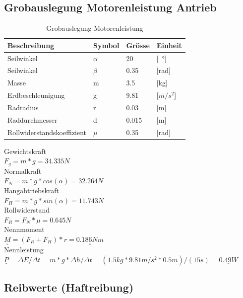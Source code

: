 \documentclass[a4paper]{report}
\begin{document}
\subsection{Grobauslegung Motorenleistung Antrieb}
\label{ssec:GrobMotor}
\begin{table}[h!]
	\begin{tabular}{|p{}|p{}|p{}|p{}|}
		\hline
		\textbf{Beschreibung} & \textbf{Symbol} & \textbf{Grösse}& \textbf{Einheit}  \\
		\hline
		Seilwinkel & $\alpha$ & 20 & [\SI{}{\degree}] \\
		\hline
		Seilwinkel & $\beta$ & 0.35 & [rad] \\
		\hline
		Masse & m & 3.5 & [kg] \\
		\hline
		Erdbeschleunigung & g & 9.81 & [$m/s^2$] \\
		\hline
		Radradius & r & 0.03 & [m] \\
		\hline
		Raddurchmesser & d & 0.015 & [m] \\
		\hline
		Rollwiderstandskoeffizient & $\mu$ & 0.35 & [rad] \\
		\hline
	\end{tabular}
	\caption{Grobauslegung Motorenleistung}
	\label{tbl:Motorenleistung}
\end{table}

\noindent
Gewichtskraft\\
$F_{g}=m*g=34.335 N$	\\
Normalkraft	\\
$F_{N}=m*g*cos(\alpha)=32.264 N$	\\
Hangabtriebskraft	\\
$F_{H}=m*g*sin(\alpha)=11.743 N$	\\
Rollwiderstand	\\
$F_{R}=F_{N}*\mu=0.645 N$	\\
Nennmoment	\\
$\underline{\underline{M}}=(F_{R}+F_{H})*r=\underline{\underline{0.186 Nm}}$	\\
Nennleistung	\\
$\underline{\underline{P}}=\Delta E/\Delta t=m*g*\Delta h/\Delta t=(1.5kg*9.81m/s^2*0.5m)/(15s)=\underline{\underline{0.49W}}$\\

\subsection{Reibwerte (Haftreibung)}
\label{ssec:ReibWer}
\end{document}
